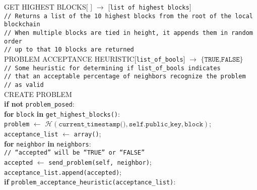 \documentclass{article}
\begin{document}
\begin{algorithm}[H]
	GET HIGHEST BLOCKS[ ] $\to$ [\texttt{list of highest blocks}] \\
		\hspace{5mm}\texttt{// Returns a list of the 10 highest blocks from the root of the
			local blockchain} \\
		\hspace{5mm}\texttt{// When multiple blocks are tied in height, it appends them in random order} \\
		\hspace{5mm}\texttt{// up to that 10 blocks are returned} \\
	PROBLEM ACCEPTANCE HEURISTIC[\texttt{list\_of\_bools}] $\to$ $\{\texttt{TRUE,FALSE}\}$\\
		\hspace{5mm}\texttt{// Some heuristic for determining if \texttt{list\_of\_bools} indicates} \\
		\hspace{5mm}\texttt{// that an acceptable percentage of neighbors recognize the problem} \\
		\hspace{5mm}\texttt{// as valid} \\
	CREATE PROBLEM \\
		\hspace{5mm}\textbf{if not} \texttt{problem\_posed}: \\
		\hspace{10mm}\textbf{for} \texttt{block} \textbf{in} \texttt{get\_highest\_blocks()}: \\
		\hspace{15mm}\texttt{problem} $\gets$ $\mathcal{H}(\texttt{current\_timestamp()},\texttt{self.public\_key},\texttt{block})$; \\
		\hspace{15mm}\texttt{acceptance\_list} $\gets$ \texttt{array()}; \\
		\hspace{15mm}\textbf{for} \texttt{neighbor} \textbf{in} \texttt{neighbors}: \\
		\hspace{20mm}\texttt{// ``accepted'' will be ``TRUE'' or ``FALSE''} \\
		\hspace{20mm}\texttt{accepted} $\gets$ \texttt{send\_problem(self, neighbor)}; \\
		\hspace{20mm}\texttt{acceptance\_list.append(accepted)}; \\
		\hspace{15mm}\textbf{if} \texttt{problem\_acceptance\_heuristic(acceptance\_list)}: \\

\end{algorithm}
\end{document}
